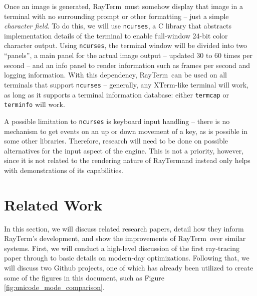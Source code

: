 \documentclass[11pt]{article}
\def\widow#1{\vskip #1\vbadness10000\penalty-200\vskip-#1}
\def\littlesection#1{
  \widow{2cm}
  \vskip 0.5cm
  \noindent{\bf #1}
  \vskip 0.0001cm
}
\newcommand{\name}{{\sc RayTerm}}
\begin{document}
Once an image is generated, \name\ must somehow display that image in a terminal with no surrounding prompt or other formatting -- just a simple {\it character field}.
To do this, we will use \texttt{ncurses}, a C library that abstracts implementation details of the terminal to enable full-window 24-bit color character output.
Using \texttt{ncurses}, the terminal window will be divided into two ``panels'', a main panel for the actual image output -- updated 30 to 60 times per second -- and an info panel to render information such as frames per second and logging information.
With this dependency, \name\ can be used on all terminals that support \texttt{ncurses} -- generally, any XTerm-like terminal will work, as long as it supports a terminal information database: either \texttt{termcap} or \texttt{terminfo} will work.

A possible limitation to \texttt{ncurses} is keyboard input handling -- there is no mechanism to get events on an up or down movement of a key, as is possible in some other libraries.
Therefore, research will need to be done on possible alternatives for the input aspect of the engine.
This is not a priority, however, since it is not related to the rendering nature of \name and instead only helps with demonstrations of its capabilities.

\section{Related Work}
\label{sec:relatedwork}


In this section, we will discuss related research papers, detail how they inform \name's development, and show the improvements of \name\ over similar systems.
First, we will conduct a high-level discussion of the first ray-tracing paper through to basic details on modern-day optimizations.
Following that, we will discuss two Github projects, one of which has already been utilized to create some of the figures in this document, such as Figure \ref{fig:unicode_mode_comparison}.


\littlesection{The First Ray-Tracer}
\end{document}
